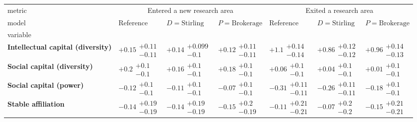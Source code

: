 \begin{tabular}{lllllll}
\toprule
metric & \multicolumn{3}{c}{Entered a new research area} & \multicolumn{3}{c}{Exited a research area} \\
model &                              Reference &                    $D=\text{Stirling}$ &                   $P=\text{Brokerage}$ &                              Reference &                    $D=\text{Stirling}$ &                   $P=\text{Brokerage}$ \\
variable                                  &                                        &                                        &                                        &                                        &                                        &                                        \\
\midrule
\textbf{Intellectual capital (diversity)} &  $\bm{+0.15}\substack{+0.11 \\ -0.11}$ &  $\bm{+0.14}\substack{+0.099 \\ -0.1}$ &  $\bm{+0.12}\substack{+0.11 \\ -0.11}$ &   $\bm{+1.1}\substack{+0.14 \\ -0.14}$ &  $\bm{+0.86}\substack{+0.12 \\ -0.12}$ &  $\bm{+0.96}\substack{+0.14 \\ -0.13}$ \\
\textbf{Social capital (diversity)}       &     $\bm{+0.2}\substack{+0.1 \\ -0.1}$ &    $\bm{+0.16}\substack{+0.1 \\ -0.1}$ &    $\bm{+0.18}\substack{+0.1 \\ -0.1}$ &         $+0.06\substack{+0.1 \\ -0.1}$ &         $+0.04\substack{+0.1 \\ -0.1}$ &         $+0.01\substack{+0.1 \\ -0.1}$ \\
\textbf{Social capital (power)}           &    $\bm{-0.12}\substack{+0.1 \\ -0.1}$ &    $\bm{-0.11}\substack{+0.1 \\ -0.1}$ &         $-0.07\substack{+0.1 \\ -0.1}$ &  $\bm{-0.31}\substack{+0.11 \\ -0.11}$ &  $\bm{-0.26}\substack{+0.11 \\ -0.11}$ &    $\bm{-0.18}\substack{+0.1 \\ -0.1}$ \\
\textbf{Stable affiliation}               &       $-0.14\substack{+0.19 \\ -0.19}$ &       $-0.14\substack{+0.19 \\ -0.19}$ &        $-0.15\substack{+0.2 \\ -0.19}$ &       $-0.11\substack{+0.21 \\ -0.21}$ &         $-0.07\substack{+0.2 \\ -0.2}$ &       $-0.15\substack{+0.21 \\ -0.21}$ \\

\end{tabular}
